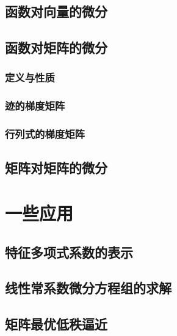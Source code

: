 \begin{definition}[]
\end{definition}

\subsection{函数对向量的微分}
\label{sub:函数对向量的微分}

\begin{definition}[]
\end{definition}

\begin{definition}[]
\end{definition}

\begin{definition}[]
\end{definition}

\subsection{函数对矩阵的微分}
\label{sub:函数对矩阵的微分}

\subsubsection{定义与性质}
\label{ssub:定义与性质}


\begin{definition}[]
\end{definition}

\subsubsection{迹的梯度矩阵}
\label{ssub:迹的梯度矩阵}

\subsubsection{行列式的梯度矩阵}
\label{ssub:行列式的梯度矩阵}

\subsection{矩阵对矩阵的微分}
\label{sub:矩阵对矩阵的微分}

\begin{definition}[]
\end{definition}

\section{一些应用}
\label{sec:一些应用}


\subsection{特征多项式系数的表示}
\label{sub:特征多项式系数的表示}

\subsection{线性常系数微分方程组的求解}
\label{sub:线性常系数微分方程组的求解}

\subsection{矩阵最优低秩逼近}
\label{sub:矩阵最优低秩逼近}

